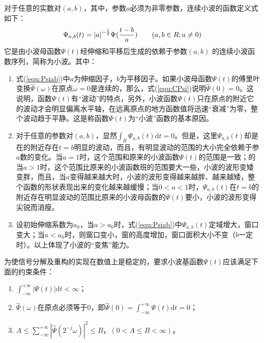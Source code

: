 对于任意的实数对$(a,b)$，其中，参数$a$必须为非零参数，连续小波的函数定义式如下：
\begin{equation}
\label{equ:Psiab}
	\Psi_{a,b} (t) = {\left| a\right| }^{-{1\over2}} \Psi({t-b\over a})\qquad
	(a,b\in R; a\neq 0)
\end{equation}
它是由小波母函数$\Psi(t)$经伸缩和平移后生成的依赖于参数$(a,b)$	的连续小波函数序列，简称为小波。其中：
\begin{enumerate}[label=（\arabic*）]
	\item 式(\ref{equ:Psiab})中$a$为伸缩因子，$b$为平移因子。如果小波母函数$\Psi(t)$的傅里叶变换$\hat{\Psi}(\omega)$在原点$\omega=0$是连续的，那么，式(\ref{equ:CPsi})说明$\hat{\Psi}(0)=0$。这说明，函数$\Psi(t)$有“波动”的特点，另外，小波函数$\Psi(t)$只在原点的附近它的波动才会明显偏离水平轴，在远离原点的地方函数值将迅速“衰减”为零，整个波动趋于平静。这是称函数$\Psi(t)$为“小波”函数的基本原因。
	\item 对于任意的参数对$(a,b)$，显然$\int_R \Psi_{a,b}(t) \mathrm{d}t = 0$。但是，这里$\Psi_{a,b}(t)$却是在的附近存在$t=b$明显的波动，而且，有明显波动的范围的大小完全依赖于参$a$数的变化。当$a=1$时，这个范围和原来的小波函数$\Psi(t)$的范围是一致；的当$a>1$时，这个范围比原来的小波函数班的范围要大一些，小波的波形变矮变胖，而且，当$a$变得越来越大时，小波的波形变得越来越胖、越来越矮，整个函数的形状表现出来的变化越来越缓慢；当$0<a<1$时，$\Psi_{a,b}(t)$在$t=b$的附近存在明显波动的范围比原来的小波母函数的$\Psi(t)$要小，小波的波形变得尖锐而消瘦。	
	\item 设初始伸缩系数为$a_0$，当$a>a_0$时，式(\ref{equ:Psiab})中$\Psi_{a,b}(t)$定域增大，窗口变大；当$a<a_0$时，则窗口变小，窗的高度增加，窗口面积大小不变（$b$一定时）。以上体现了小波的“变焦”能力。
\end{enumerate}

为使信号分解及重构的实现在数值上是稳定的，要求小波基函数$\Psi(t)$应该满足下面的约束条件：
\begin{enumerate}[label=（\arabic*）]
	\item $\int_{-\infty}^{+\infty} |\Psi(t)| \mathrm{d}t < \infty$；
	\item $\hat{\Psi}(\omega)$在原点必须等于0，即$\hat{\Psi}(0) = \int_{-\infty}^{+\infty} \Psi(t) \mathrm{d}t = 0$；
	\item $A\leqslant  \sum_{-\infty}^{+\infty} {|\hat{\Psi}(2^{-j}\omega)|}^2  \leqslant B$，$(0<A\leqslant B < \infty)$。
\end{enumerate}

